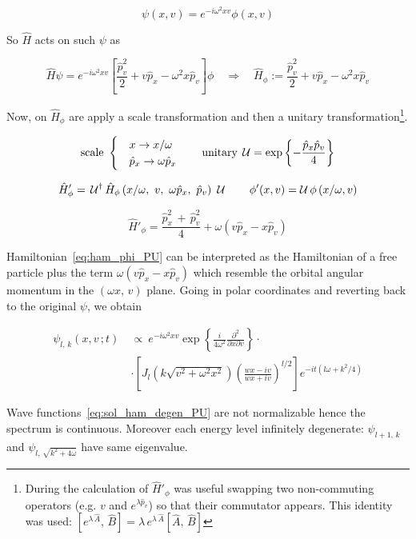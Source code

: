 \begin{equation*}
  \psi(x, v) = e^{-i\omega^2xv}\phi(x,v)
\end{equation*}

So $\hat{H}$ acts on such $\psi$ as

\begin{equation*}
  \hat{H} \psi = e^{-i\omega^2xv}
  \left[\frac{\hat{p}_v^2}{2} + v\hat{p}_x - \omega^2x\hat{p}_v \right] \phi
  \quad \Rightarrow \quad
  \hat{H}_{\phi} :=
  \frac{\hat{p}_v^2}{2} + v\hat{p}_x - \omega^2x\hat{p}_v
\end{equation*}

Now, on $\hat{H}_{\phi}$ are apply a scale transformation and then a unitary
transformation\footnote{
  During the calculation of $\hat{H}'_{\phi}$ was useful swapping
  two non-commuting operators (e.g. $v$ and $e^{\lambda \hat{p}_v}$)
  so that their commutator appears. This identity was used:
  $\left[e^{\lambda \, \hat{A}}, \, \hat{B}\right] =
  \lambda \, e^{\lambda \, \hat{A}} \left[\hat{A} , \, \hat{B} \right]$
}.

\begin{equation*}
  \text{scale} \
  \begin{cases}
    &x         \rightarrow x/\omega \\
    &\hat{p}_x \rightarrow \omega\hat{p}_x
  \end{cases}
  \qquad \text{unitary} \;
  \operatorname{\mathcal{U}} = \exp\left\{ - \frac{\hat{p}_x \hat{p}_v}{4}\right\}
\end{equation*}

\begin{equation*}
  \hat{H}'_{\phi} = \, \U^{\dagger}
  \hat{H}_{\phi} \left(x/\omega,\ v,\ \omega \hat{p}_x,\ \hat{p}_v\right)
  \ \U \qquad
  \phi'(x, v) = \U \phi\left(x/\omega, v\right)
\end{equation*}

\begin{equation} \label{eq:ham_phi_PU}
  \hat{H}'_{\phi} = \frac{\hat{p}^2_x \, + \, \hat{p}^2_{v}}{4}
  + \omega \left(v \hat{p}_x - x \hat{p}_v \right)
\end{equation}

Hamiltonian~\eqref{eq:ham_phi_PU} can be interpreted as the Hamiltonian of a
free particle plus the term $\omega \left(v \hat{p}_x - x \hat{p}_v \right)$
which resemble the orbital angular momentum in the $(\omega x, \, v)$ plane.
Going in polar coordinates and reverting back to the original $\psi$, we obtain

\begin{align} \label{eq:sol_ham_degen_PU}
  \psi_{l, \, k}(x, v \,; t) \ &\propto \
  e^{-i\omega^2xv}
  \exp\left\{
    \frac{i}{4\omega^2} \frac{\partial^2}{\partial x \partial v}
  \right\} \cdot \nonumber \\
  &\cdot \left[
    J_l \left(k\sqrt{v^2 + \omega^2 x^2}\right)
    {\left( \frac{wx - iv}{wx +iv} \right)}^{l/2}
  \right]
  e^{-it (l\omega + k^2/4)}
\end{align}

Wave functions~\eqref{eq:sol_ham_degen_PU} are not normalizable hence the
spectrum is continuous. Moreover each energy level infinitely degenerate:
$\psi_{l+1, \, k}$ and $\psi_{l, \, \sqrt{k^2 + 4 \omega}}$ have same
eigenvalue.
